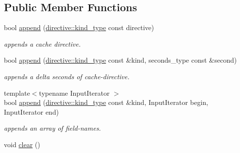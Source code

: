 \subsection*{Public Member Functions}
\begin{DoxyCompactItemize}
\item 
\hypertarget{classhryky_1_1http_1_1header_1_1cache_1_1control_1_1_entity_ab9a90afb6b1ed5125e7e7648f910f8f7}{bool \hyperlink{classhryky_1_1http_1_1header_1_1cache_1_1control_1_1_entity_ab9a90afb6b1ed5125e7e7648f910f8f7}{append} (\hyperlink{classhryky_1_1_kind}{directive\-::kind\-\_\-type} const directive)}\label{classhryky_1_1http_1_1header_1_1cache_1_1control_1_1_entity_ab9a90afb6b1ed5125e7e7648f910f8f7}

\begin{DoxyCompactList}\small\item\em appends a cache directive. \end{DoxyCompactList}\item 
\hypertarget{classhryky_1_1http_1_1header_1_1cache_1_1control_1_1_entity_ae9db6ca0863814c1524f8bacb319c614}{bool \hyperlink{classhryky_1_1http_1_1header_1_1cache_1_1control_1_1_entity_ae9db6ca0863814c1524f8bacb319c614}{append} (\hyperlink{classhryky_1_1_kind}{directive\-::kind\-\_\-type} const \&kind, seconds\-\_\-type const \&second)}\label{classhryky_1_1http_1_1header_1_1cache_1_1control_1_1_entity_ae9db6ca0863814c1524f8bacb319c614}

\begin{DoxyCompactList}\small\item\em appends a delta seconds of cache-\/directive. \end{DoxyCompactList}\item 
\hypertarget{classhryky_1_1http_1_1header_1_1cache_1_1control_1_1_entity_a0f7d4ba0fcc97b1d1be6c8ba37581802}{{\footnotesize template$<$typename Input\-Iterator $>$ }\\bool \hyperlink{classhryky_1_1http_1_1header_1_1cache_1_1control_1_1_entity_a0f7d4ba0fcc97b1d1be6c8ba37581802}{append} (\hyperlink{classhryky_1_1_kind}{directive\-::kind\-\_\-type} const \&kind, Input\-Iterator begin, Input\-Iterator end)}\label{classhryky_1_1http_1_1header_1_1cache_1_1control_1_1_entity_a0f7d4ba0fcc97b1d1be6c8ba37581802}

\begin{DoxyCompactList}\small\item\em appends an array of field-\/names. \end{DoxyCompactList}\item 
\hypertarget{classhryky_1_1http_1_1header_1_1cache_1_1control_1_1_entity_a569508667f7f2e82395c636fc4c77c37}{void \hyperlink{classhryky_1_1http_1_1header_1_1cache_1_1control_1_1_entity_a569508667f7f2e82395c636fc4c77c37}{clear} ()}\label{classhryky_1_1http_1_1header_1_1cache_1_1control_1_1_entity_a569508667f7f2e82395c636fc4c77c37}


\end{DoxyCompactItemize}
